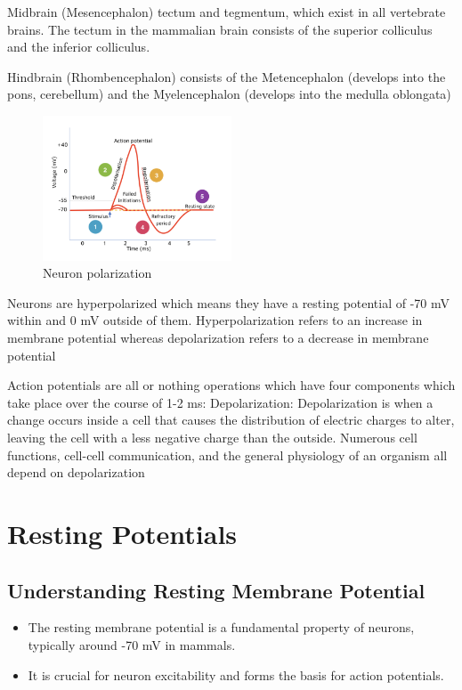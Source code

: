 \documentclass{article}
\begin{document}
    \noindent Midbrain (Mesencephalon) tectum and tegmentum, which exist in all vertebrate brains. The tectum in the mammalian brain consists of the superior colliculus and the inferior colliculus.
    
    \noindent Hindbrain (Rhombencephalon) consists of the Metencephalon (develops into the pons, cerebellum) and the Myelencephalon (develops into the medulla oblongata)
    
    \begin{figure}[H]
    \centering
    \includegraphics[width=0.5\textwidth]{assets/polarization.png}
    \caption{Neuron polarization}
    \end{figure}
    
    \noindent Neurons are hyperpolarized which means they have a resting potential of -70 mV within and 0 mV outside of them. Hyperpolarization refers to an increase in membrane potential whereas depolarization refers to a decrease in membrane potential
    
    \noindent Action potentials are all or nothing operations which have four components which take place over the course of 1-2 ms:
    Depolarization: Depolarization is when a change occurs inside a cell that causes the distribution of electric charges to alter, leaving the cell with a less negative charge than the outside. Numerous cell functions, cell-cell communication, and the general physiology of an organism all depend on depolarization
    

\section{Resting Potentials}

\subsection{Understanding Resting Membrane Potential}
\begin{itemize}
    \item The resting membrane potential is a fundamental property of neurons, typically around -70 mV in mammals. 
    \item It is crucial for neuron excitability and forms the basis for action potentials.
\end{itemize}
\end{document}
